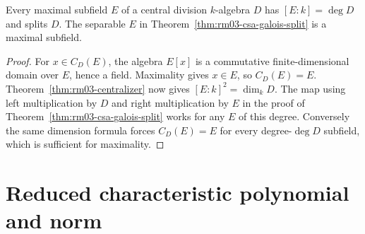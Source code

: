 \begin{corollary}
\label{cor:rm03-maximal-subfield}
Every maximal subfield \(E\) of a central division \(k\)-algebra
\(D\) has \([E:k]=\deg D\) and splits \(D\). The separable \(E\)
in Theorem~\ref{thm:rm03-csa-galois-split} is a maximal subfield.
\end{corollary}
\begin{proof}
For \(x\in C_D(E)\), the algebra \(E[x]\) is a commutative
finite-dimensional domain over \(E\), hence a field. Maximality
gives \(x\in E\), so \(C_D(E)=E\). Theorem~\ref{thm:rm03-centralizer}
now gives \([E:k]^2=\dim_k D\). The map using left multiplication
by \(D\) and right multiplication by \(E\) in the proof of
Theorem~\ref{thm:rm03-csa-galois-split} works for any \(E\) of
this degree. Conversely the same dimension formula forces
\(C_D(E)=E\) for every degree-\(\deg D\) subfield, which is
sufficient for maximality.
\end{proof}

\section{Reduced characteristic polynomial and norm}

